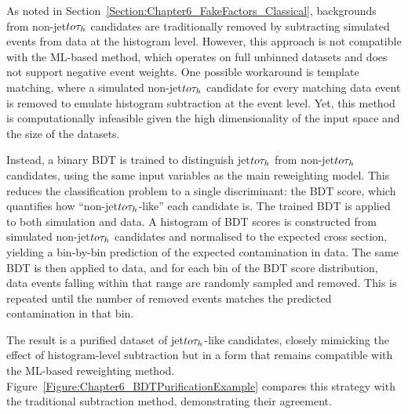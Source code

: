 As noted in Section~\ref{Section:Chapter6_FakeFactors_Classical}, backgrounds from non-jet$to\tau_h$ candidates are traditionally removed by subtracting simulated events from data at the histogram level. However, this approach is not compatible with the \ac{ML}-based method, which operates on full unbinned datasets and does not support negative event weights. One possible workaround is template matching, where a simulated non-jet$to\tau_h$ candidate for every matching data event is removed to emulate histogram subtraction at the event level. Yet, this method is computationally infeasible given the high dimensionality of the input space and the size of the datasets.

Instead, a binary \ac{BDT} is trained to distinguish jet$to\tau_h$ from non-jet$to\tau_h$ candidates, using the same input variables as the main reweighting model. This reduces the classification problem to a single discriminant: the \ac{BDT} score, which quantifies how ``non-jet$to\tau_h$-like'' each candidate is. The trained \ac{BDT} is applied to both simulation and data. A histogram of \ac{BDT} scores is constructed from simulated non-jet$to\tau_h$ candidates and normalised to the expected cross section, yielding a bin-by-bin prediction of the expected contamination in data. The same \ac{BDT} is then applied to data, and for each bin of the \ac{BDT} score distribution, data events falling within that range are randomly sampled and removed. This is repeated until the number of removed events matches the predicted contamination in that bin.

The result is a purified dataset of jet$to\tau_h$-like candidates, closely mimicking the effect of histogram-level subtraction but in a form that remains compatible with the \ac{ML}-based reweighting method. Figure~\ref{Figure:Chapter6_BDTPurificationExample} compares this strategy with the traditional subtraction method, demonstrating their agreement.

